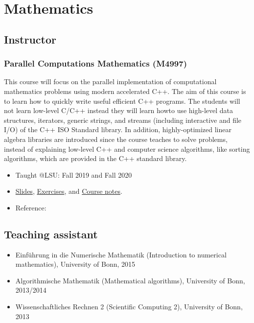 \documentclass[11pt,a4paper]{article}
\begin{document}
\section*{Mathematics}

\subsection*{Instructor}

\subsubsection*{Parallel Computations Mathematics (M4997)}
This course will focus on the parallel implementation of computational mathematics problems using modern accelerated C++. The aim of this course is to learn how to quickly write useful efficient C++ programs. The students will not learn low-level C/C++ instead they will learn howto use high-level data structures, iterators, generic strings, and streams (including interactive and file I/O) of the C++ ISO Standard library. In addition, highly-optimized linear algebra libraries are introduced since the course teaches to solve problems, instead of explaining low-level C++ and computer science algorithms, like sorting algorithms, which are provided in the C++ standard library.
\begin{itemize}
\item Taught @LSU: Fall 2019 and Fall 2020
\item \href{https://github.com/diehlpkteaching/ParallelComputationMath}{Slides}, \href{https://github.com/diehlpkteaching/ParallelComputationMathExercise}{Exercises}, and \href{https://github.com/diehlpkteaching/ParallelComputationMathScript}{Course notes}.
\item Reference:~\cite{https://doi.org/10.1002/cpe.6893}
\end{itemize}

\subsection*{Teaching assistant}
\begin{itemize}
\item Einf\"uhrung in die Numerische Mathematik (Introduction to numerical mathematics), University of Bonn, 2015
\item Algorithmische Mathematik (Mathematical algorithms), University of Bonn, 2013/2014
\item Wissenschaftliches Rechnen 2 (Scientific Computing 2),  University of Bonn, 2013 
\end{itemize}
\end{document}
